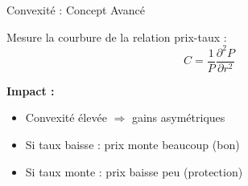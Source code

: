 \documentclass[10pt,aspectratio=169,xcolor={dvipsnames}]{beamer}
\begin{document}
\begin{frame}{Convexité : Concept Avancé}
\begin{definition}[Convexité]
Mesure la courbure de la relation prix-taux :
\[
C = \frac{1}{P}\frac{\partial^2 P}{\partial r^2}
\]
\end{definition}

\textbf{Impact :}
\begin{itemize}
    \item Convexité élevée $\Rightarrow$ gains asymétriques
    \item Si taux baisse : prix monte beaucoup (bon)
    \item Si taux monte : prix baisse peu (protection)
\end{itemize}

\vspace{0.3cm}
\begin{center}
\end{center}
\end{frame}
\end{document}
